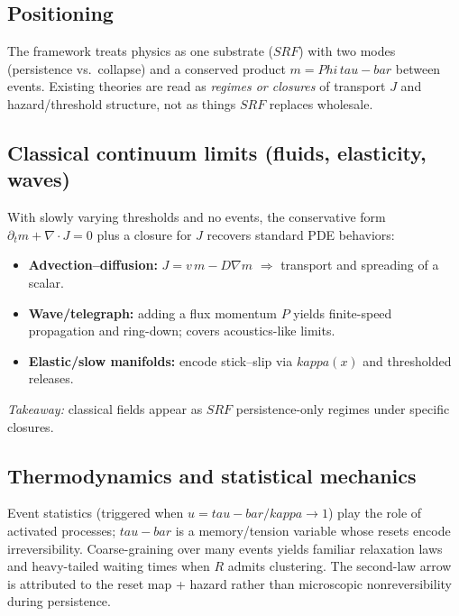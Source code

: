 \documentclass[12pt]{article}
\newcommand{\FoldDensity}{\Phi}
\newcommand{\FoldTime}{\bar{\tau}}
\newcommand{\Threshold}{\kappa}
\newcommand{\Release}{R}
\newcommand{\SRF}{\mathcal{F}_{\mathrm{SR}}}
\def\FoldDensity{Phi}%
\def\FoldTime{tau-bar}%
\def\Threshold{kappa}%
\def\SRF{SRF}%
\def\Release{R}%
\def\bar#1{#1}%
\def\mathcal#1{#1}%
\def\mathrm#1{#1}%
\begin{document}
\subsection{Positioning}
The framework treats physics as one substrate ($\SRF$) with two modes (persistence vs.\ collapse) and a conserved product $m=\FoldDensity\,\FoldTime$ between events. Existing theories are read as \emph{regimes or closures} of transport $J$ and hazard/threshold structure, not as things $\SRF$ replaces wholesale.

\subsection{Classical continuum limits (fluids, elasticity, waves)}
With slowly varying thresholds and no events, the conservative form
$\partial_t m+\nabla\!\cdot J=0$ plus a closure for $J$ recovers standard PDE behaviors:
\begin{itemize}
  \item \textbf{Advection--diffusion:} $J=v\,m-D\nabla m$ $\Rightarrow$ transport and spreading of a scalar.
  \item \textbf{Wave/telegraph:} adding a flux momentum $P$ yields finite-speed propagation and ring-down; covers acoustics-like limits.
  \item \textbf{Elastic/slow manifolds:} encode stick--slip via $\Threshold(x)$ and thresholded releases.
\end{itemize}
\textit{Takeaway:} classical fields appear as $\SRF$ persistence-only regimes under specific closures.

\subsection{Thermodynamics and statistical mechanics}
Event statistics (triggered when $u=\FoldTime/\Threshold\to 1$) play the role of activated processes; $\FoldTime$ is a memory/tension variable whose resets encode irreversibility. Coarse-graining over many events yields familiar relaxation laws and heavy-tailed waiting times when $\Release$ admits clustering. The second-law arrow is attributed to the reset map + hazard rather than microscopic nonreversibility during persistence.
\end{document}
